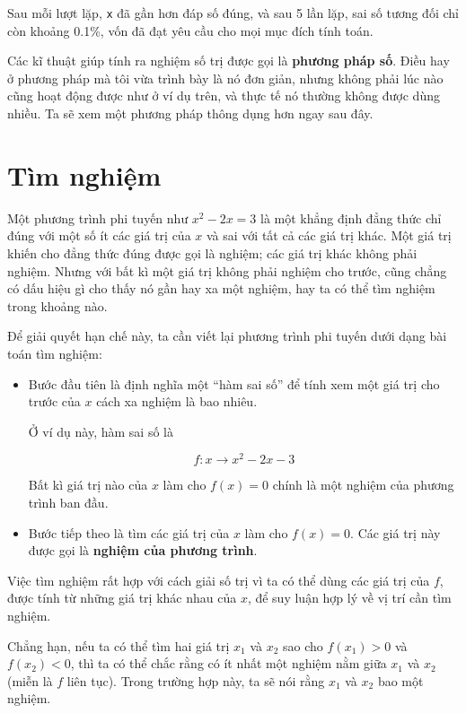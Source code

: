 \documentclass[12pt]{book}
\begin{document}
Sau mỗi lượt lặp, {\tt x} đã gần hơn đáp số đúng,
và sau 5 lần lặp, sai số tương đối chỉ còn khoảng 0.1\%, vốn
đã đạt yêu cầu cho mọi mục đích tính toán.

Các kĩ thuật giúp tính ra nghiệm số trị được gọi là 
{\bf phương pháp số}. Điều hay ở phương pháp mà tôi vừa
trình bày là nó đơn giản, nhưng không phải lúc nào cũng
hoạt động được như ở ví dụ trên, và thực tế nó thường
không được dùng nhiều. Ta sẽ xem một phương pháp 
thông dụng hơn ngay sau đây.


\section{Tìm nghiệm}
\label{zero}

Một phương trình phi tuyến như $x^2 - 2x = 3$ là một 
khẳng định đẳng thức chỉ đúng với một số ít các giá trị của $x$
và sai với tất cả các giá trị khác. Một giá trị khiến cho đẳng thức
đúng được gọi là nghiệm; các giá trị khác không phải nghiệm.
Nhưng với bất kì một giá trị không phải nghiệm cho trước, cũng
chẳng có dấu hiệu gì cho thấy nó gần hay xa một nghiệm, hay
ta có thể tìm nghiệm trong khoảng nào.

Để giải quyết hạn chế này, ta cần viết lại phương trình
phi tuyến dưới dạng bài toán tìm nghiệm:

\begin{itemize}

\item Bước đầu tiên là định nghĩa một
``hàm sai số'' để tính xem một giá trị cho trước
của $x$ cách xa nghiệm là bao nhiêu.

Ở ví dụ này, hàm sai số là

\[ f : x \to x^2 - 2x -3 \]

Bất kì giá trị nào của $x$ làm cho $f(x) = 0$ chính là một
nghiệm của phương trình ban đầu.

\item Bước tiếp theo là tìm các giá trị của $x$ làm cho
$f(x) = 0$. Các giá trị này được gọi là {\bf nghiệm của phương trình}.

\end{itemize}

Việc tìm nghiệm rất hợp với cách giải số trị vì ta có thể dùng
các giá trị của $f$, được tính từ những giá trị khác nhau của $x$, 
để suy luận hợp lý về vị trí cần tìm nghiệm.

Chẳng hạn, nếu ta có thể tìm hai giá trị $x_1$ và $x_2$ sao cho
$f(x_1) > 0$ và $f(x_2) < 0$, thì ta có thể chắc rằng có ít nhất một
nghiệm nằm giữa $x_1$ và $x_2$ (miễn là $f$ liên tục). Trong trường
hợp này, ta sẽ nói rằng $x_1$ và $x_2$ bao một nghiệm.
\end{document}
